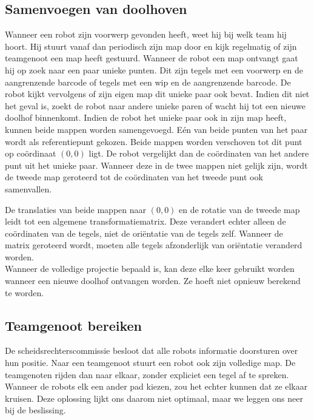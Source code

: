 \documentclass[tt3]{penoverslag}
\begin{document}
\subsection{Samenvoegen van doolhoven}
\label{ssec:AlgoMappen}
Wanneer een robot zijn voorwerp gevonden heeft, weet hij bij welk team hij hoort. Hij stuurt vanaf dan periodisch zijn map door en kijk regelmatig of zijn teamgenoot een map heeft gestuurd.
Wanneer de robot een map ontvangt gaat hij op zoek naar een paar unieke punten. Dit zijn tegels met een voorwerp en de aangrenzende barcode of tegels met een wip en de aangrenzende barcode. De robot kijkt vervolgens of zijn eigen map dit unieke paar ook bevat. Indien dit niet het geval is, zoekt de robot naar andere unieke paren of wacht hij tot een nieuwe doolhof binnenkomt.
Indien de robot het unieke paar ook in zijn map heeft, kunnen beide mappen worden samengevoegd. E\'en van beide punten van het paar wordt als referentiepunt gekozen. Beide mappen worden verschoven tot dit punt op co\"ordinaat $(0,0)$ ligt. De robot vergelijkt dan de co\"ordinaten van het andere punt uit het unieke paar. Wanneer deze in de twee mappen niet gelijk zijn, wordt de tweede map geroteerd tot de co\"ordinaten van het tweede punt ook samenvallen.

De translaties van beide mappen naar $(0,0)$ en de rotatie van de tweede map leidt tot een algemene transformatiematrix. Deze verandert echter alleen de co\"ordinaten van de tegels, niet de ori\"entatie van de tegels zelf. Wanneer de matrix geroteerd wordt, moeten alle tegels afzonderlijk van ori\"entatie veranderd worden.\\

Wanneer de volledige projectie bepaald is, kan deze elke keer gebruikt worden wanneer een nieuwe doolhof ontvangen worden. Ze hoeft niet opnieuw berekend te worden.

\subsection{Teamgenoot bereiken}
\label{ssec:AlgoAndereRobot}
De scheidsrechterscommissie besloot dat alle robots informatie doorsturen over hun positie. Naar een teamgenoot stuurt een robot ook zijn volledige map. De teamgenoten rijden dan naar elkaar, zonder expliciet een tegel af te spreken. Wanneer de robots elk een ander pad kiezen, zou het echter kunnen dat ze elkaar kruisen. Deze oplossing lijkt ons daarom niet optimaal, maar we leggen ons neer bij de beslissing.\\
\end{document}
